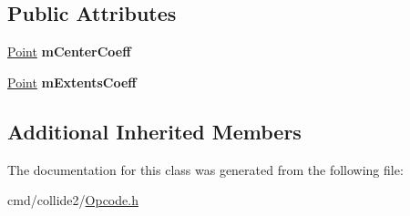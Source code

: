 \subsection*{Public Attributes}
\begin{DoxyCompactItemize}
\item 
\hyperlink{classOpcode_1_1Point}{Point} {\bfseries m\+Center\+Coeff}\hypertarget{classOpcode_1_1AABBQuantizedTree_a821fe621bfe8a27b2629dfd4a684fdd7}{}\label{classOpcode_1_1AABBQuantizedTree_a821fe621bfe8a27b2629dfd4a684fdd7}

\item 
\hyperlink{classOpcode_1_1Point}{Point} {\bfseries m\+Extents\+Coeff}\hypertarget{classOpcode_1_1AABBQuantizedTree_a9648936c2107bda3d055f66390bd0c1a}{}\label{classOpcode_1_1AABBQuantizedTree_a9648936c2107bda3d055f66390bd0c1a}

\end{DoxyCompactItemize}
\subsection*{Additional Inherited Members}


The documentation for this class was generated from the following file\+:\begin{DoxyCompactItemize}
\item 
cmd/collide2/\hyperlink{Opcode_8h}{Opcode.\+h}\end{DoxyCompactItemize}
